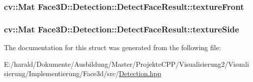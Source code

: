 \subsubsection[{\texorpdfstring{texture\+Front}{textureFront}}]{\setlength{\rightskip}{0pt plus 5cm}cv\+::\+Mat Face3\+D\+::\+Detection\+::\+Detect\+Face\+Result\+::texture\+Front}\hypertarget{struct_face3_d_1_1_detection_1_1_detect_face_result_a2377f5ef21e5b7a4f1194ef42963f4c6}{}\label{struct_face3_d_1_1_detection_1_1_detect_face_result_a2377f5ef21e5b7a4f1194ef42963f4c6}
\subsubsection[{\texorpdfstring{texture\+Side}{textureSide}}]{\setlength{\rightskip}{0pt plus 5cm}cv\+::\+Mat Face3\+D\+::\+Detection\+::\+Detect\+Face\+Result\+::texture\+Side}\hypertarget{struct_face3_d_1_1_detection_1_1_detect_face_result_a2a38d56093e878bb3bd363583d1667a3}{}\label{struct_face3_d_1_1_detection_1_1_detect_face_result_a2a38d56093e878bb3bd363583d1667a3}


The documentation for this struct was generated from the following file\+:\begin{DoxyCompactItemize}
\item 
E\+:/harald/\+Dokumente/\+Ausbildung/\+Master/\+Projekte\+C\+P\+P/\+Visualisierung2/\+Visualisierung/\+Implementierung/\+Face3d/src/\hyperlink{_detection_8hpp}{Detection.\+hpp}\end{DoxyCompactItemize}
